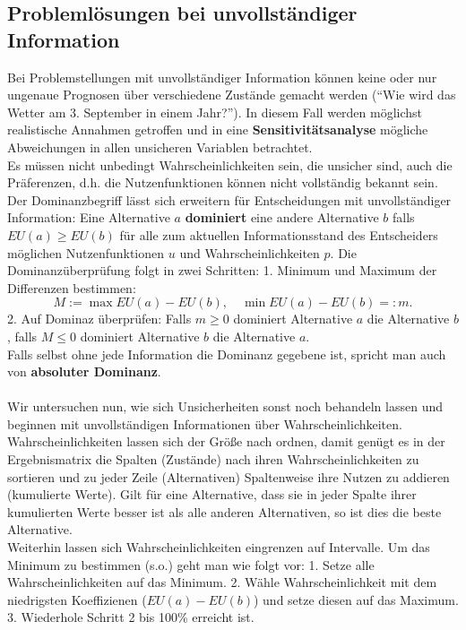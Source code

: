 \subsection{Problemlösungen bei unvollständiger Information}
Bei Problemstellungen mit unvollständiger Information können keine oder nur ungenaue Prognosen über verschiedene Zustände gemacht werden (``Wie wird das Wetter am 3. September in einem Jahr?''). In diesem Fall werden möglichst realistische Annahmen getroffen und in eine \textbf{Sensitivitätsanalyse} mögliche Abweichungen in allen unsicheren Variablen betrachtet.\\
Es müssen nicht unbedingt Wahrscheinlichkeiten sein, die unsicher sind, auch die Präferenzen, d.h. die Nutzenfunktionen können nicht vollständig bekannt sein.\\
Der Dominanzbegriff lässt sich erweitern für Entscheidungen mit unvollständiger Information: Eine Alternative \(a\) \textbf{dominiert} eine andere Alternative \(b\) falls \(EU(a) \geq EU(b)\) für alle zum aktuellen Informationsstand des Entscheiders möglichen Nutzenfunktionen \(u\) und Wahrscheinlichkeiten \(p\).
Die Dominanzüberprüfung folgt in zwei Schritten: 1. Minimum und Maximum der Differenzen bestimmen:
\[
	M := \max EU(a)-EU(b),\quad \min EU(a)-EU(b) =: m.
\]
2. Auf Dominaz überprüfen: Falls \(m \geq 0\) dominiert Alternative \(a\) die Alternative \(b\), falls \(M \leq 0\) dominiert Alternative \(b\) die Alternative \(a\).\\
Falls selbst ohne jede Information die Dominanz gegebene ist, spricht man auch von \textbf{absoluter Dominanz}.\\
\ \\
Wir untersuchen nun, wie sich Unsicherheiten sonst noch behandeln lassen und beginnen mit unvollständigen Informationen über Wahrscheinlichkeiten. Wahrscheinlichkeiten lassen sich der Größe nach ordnen, damit genügt es in der Ergebnismatrix die Spalten (Zustände) nach ihren Wahrscheinlichkeiten zu sortieren und zu jeder Zeile (Alternativen) Spaltenweise ihre Nutzen zu addieren (kumulierte Werte). Gilt für eine Alternative, dass sie in jeder Spalte ihrer kumulierten Werte besser ist als alle anderen Alternativen, so ist dies die beste Alternative.\\
Weiterhin lassen sich Wahrscheinlichkeiten eingrenzen auf Intervalle. Um das Minimum zu bestimmen (s.o.) geht man wie folgt vor: 1. Setze alle Wahrscheinlichkeiten auf das Minimum. 2. Wähle Wahrscheinlichkeit mit dem niedrigsten Koeffizienen (\(EU(a)-EU(b)\)) und setze diesen auf das Maximum. 3. Wiederhole Schritt 2 bis 100\% erreicht ist.\\
